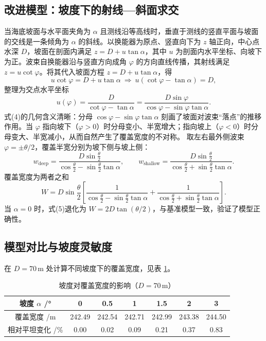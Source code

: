 \documentclass[12pt]{ctexart}
\begin{document}
\subsection{改进模型：坡度下的射线—斜面求交}

当海底坡面与水平面夹角为 $\alpha$ 且测线沿等高线时，垂直于测线的竖直平面与坡面的交线是一条倾角为 $\alpha$ 的斜线。以换能器为原点、竖直向下为 $z$ 轴正向，中心点水深 $D$，坡面在剖面内满足 $z=D+u\tan\alpha$，其中 $u$ 为剖面内水平坐标、向坡下为正。波束自换能器沿与竖直方向成角 $\varphi$ 的方向直线传播，其射线满足 $z=u\cot\varphi$。将其代入坡面方程 $z=D+u\tan\alpha$，得
\begin{equation}
u\cot\varphi=D+u\tan\alpha\ \Longrightarrow\ u(\cot\varphi-\tan\alpha)=D,
\end{equation}
整理为交点水平坐标
\begin{equation}
u(\varphi)=\frac{D}{\cot\varphi-\tan\alpha}=\frac{D\sin\varphi}{\cos\varphi-\sin\varphi\tan\alpha}.
\end{equation}
式(4)的几何含义清晰：分母 $\cos\varphi-\sin\varphi\tan\alpha$ 刻画了坡面对波束``落点''的推移作用。当 $\varphi$ 指向坡下（$\varphi>0$）时分母变小、半宽增大；指向坡上（$\varphi<0$）时分母变大、半宽减小，从而自然产生了覆盖宽度的不对称。
取左右最外侧波束 $\varphi=\pm\theta/2$，覆盖半宽分别为坡下侧与坡上侧：
\begin{equation}
w_{\mathrm{deep}}=\frac{D\sin\frac{\theta}{2}}{\cos\frac{\theta}{2}-\sin\frac{\theta}{2}\tan\alpha},\qquad
w_{\mathrm{shallow}}=\frac{D\sin\frac{\theta}{2}}{\cos\frac{\theta}{2}+\sin\frac{\theta}{2}\tan\alpha}.
\end{equation}
覆盖宽度为两者之和
\begin{equation}
\boxed{W=D\sin\frac{\theta}{2}\left[\frac{1}{\cos\frac{\theta}{2}-\sin\frac{\theta}{2}\tan\alpha}
+\frac{1}{\cos\frac{\theta}{2}+\sin\frac{\theta}{2}\tan\alpha}\right]}.
\end{equation}
当 $\alpha=0$ 时，式(5)退化为 $W=2D\tan(\theta/2)$，与基准模型一致，验证了模型正确性。

\subsection{模型对比与坡度灵敏度}

在 $D=70\,\mathrm{m}$ 处计算不同坡度下的覆盖宽度，见表 \ref{tab:p1sens}。

\begin{table}[H]\centering
\caption{坡度对覆盖宽度的影响（$D=70\,\mathrm{m}$）}
\label{tab:p1sens}
\begin{tabular}{ccccccc}
\toprule
坡度 $\alpha$ /° & 0 & 0.5 & 1 & 1.5 & 2 & 3 \\
\midrule
覆盖宽度 /m & 242.49 & 242.54 & 242.71 & 242.99 & 243.38 & 244.50 \\
相对平坦变化 /\% & 0.00 & 0.02 & 0.09 & 0.21 & 0.37 & 0.83 \\
\bottomrule
\end{tabular}
\end{table}
\end{document}
